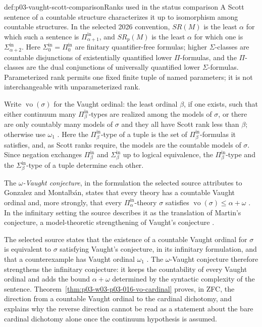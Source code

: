 \begin{hbdefinition}{def:p03-vaught-scott-comparison}{Ranks used in the status comparison}
A Scott sentence of a countable structure characterizes it up to isomorphism
among countable structures. In the selected 2026 convention,
\(SR(M)\) is the least \(\alpha\) for which such a sentence is
\(\Pi^{\mathrm{in}}_{\alpha+1}\), and \(SR_p(M)\) is the least
\(\alpha\) for which one is \(\Sigma^{\mathrm{in}}_{\alpha+2}\).
Here \(\Sigma^{\mathrm{in}}_0=\Pi^{\mathrm{in}}_0\) are finitary
quantifier-free formulas; higher \(\Sigma\)-classes are countable
disjunctions of existentially quantified lower \(\Pi\)-formulas, and the
\(\Pi\)-classes are the dual conjunctions of universally quantified lower
\(\Sigma\)-formulas. Parameterized rank permits one fixed finite tuple of
named parameters; it is not interchangeable with unparameterized rank.

Write \(\operatorname{vo}(\sigma)\) for the Vaught ordinal: the least
ordinal \(\beta\), if one exists, such that either continuum many
\(\Pi^{\mathrm{in}}_\beta\)-types are realized among the models of
\(\sigma\), or there are only countably many models of \(\sigma\) and they
all have Scott rank less than \(\beta\); otherwise use \(\omega_1\)
\cite[p.~6]{GonzalezRosseggerTuretsky2026Status}. Here the
\(\Pi^{\mathrm{in}}_\beta\)-type of a tuple is the set of
\(\Pi^{\mathrm{in}}_\beta\)-formulas it satisfies, and, as Scott ranks
require, the models are the countable models of \(\sigma\). Since negation
exchanges \(\Pi^{\mathrm{in}}_\beta\) and \(\Sigma^{\mathrm{in}}_\beta\)
up to logical equivalence, the \(\Pi^{\mathrm{in}}_\beta\)-type and the
\(\Sigma^{\mathrm{in}}_\beta\)-type of a tuple determine each other.

The \emph{\(\omega\)-Vaught conjecture}, in the formulation the selected
source attributes to Gonzalez and Montalb\'an, states that every theory
has a countable Vaught ordinal and, more strongly, that every
\(\Pi^{\mathrm{in}}_\alpha\)-theory \(\sigma\) satisfies
\(\operatorname{vo}(\sigma)\leq\alpha+\omega\)
\cite[p.~4]{GonzalezRosseggerTuretsky2026Status}. In the infinitary setting
the source describes it as the translation of Martin's conjecture, a
model-theoretic strengthening of Vaught's conjecture
\cite[p.~4]{GonzalezRosseggerTuretsky2026Status}.
\end{hbdefinition}

The selected source states that the existence of a countable Vaught ordinal
for \(\sigma\) is equivalent to \(\sigma\) satisfying Vaught's conjecture,
in its infinitary formulation, and that a counterexample has Vaught ordinal
\(\omega_1\) \cite[pp.~2, 6]{GonzalezRosseggerTuretsky2026Status}. The
\(\omega\)-Vaught conjecture therefore strengthens the infinitary conjecture:
it keeps the countability of every Vaught ordinal and adds the bound
\(\alpha+\omega\) determined by the syntactic complexity of the sentence.
Theorem~\ref{thm:p03-w03-p03-016-vo-cardinal} proves, in ZFC, the direction
from a countable Vaught ordinal to the cardinal dichotomy, and explains why
the reverse direction cannot be read as a statement about the bare cardinal
dichotomy alone once the continuum hypothesis is assumed.


